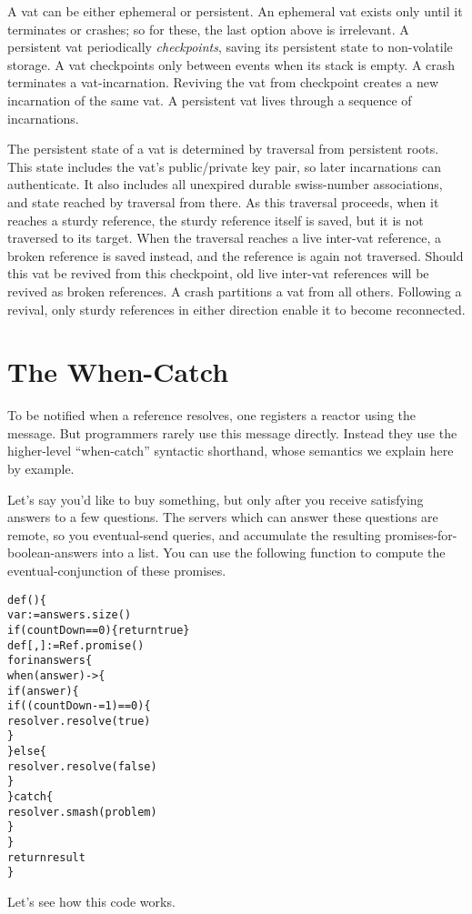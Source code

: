 \documentclass{llncs}
\begin{document}
A vat can be either ephemeral or persistent. An ephemeral vat exists
only until it terminates or crashes; so for these, the last option
above is irrelevant. A persistent vat periodically \emph{checkpoints},
saving its persistent state to non-volatile storage. A vat checkpoints
only between events when its stack is empty. A crash terminates a
vat-incarnation. Reviving the vat from checkpoint creates a new
incarnation of the same vat. A persistent vat lives through a sequence
of incarnations.

The persistent state of a vat is determined by traversal from
persistent roots. This state includes the vat's public/private key
pair, so later incarnations can authenticate. It also includes all
unexpired durable swiss-number associations, and state reached by
traversal from there. As this traversal proceeds, when it reaches a
sturdy reference, the sturdy reference itself is saved, but it is not
traversed to its target. When the traversal reaches a live inter-vat
reference, a broken reference is saved instead, and the reference is
again not traversed. Should this vat be revived from this checkpoint,
old live inter-vat references will be revived as broken references. A
crash partitions a vat from all others. Following a revival, only
sturdy references in either direction enable it to become reconnected.

\section{The When-Catch}

To be notified when a reference resolves, one registers a reactor
using the  message. But programmers rarely
use this message directly. Instead they use the higher-level
``when-catch'' syntactic shorthand, whose semantics we explain here by
example.

Let's say you'd like to buy something, but only after you receive
satisfying answers to a few questions. The servers which can answer
these questions are remote, so you eventual-send queries, and
accumulate the resulting promises-for-boolean-answers into a list. You
can use the following  function to compute the
eventual-conjunction of these promises.
%
\begin{alltt}
    def () \{
        var  := answers.size()
        if (countDown == 0) \{ return true \}
        def [, ] := Ref.promise()
        for  in answers \{
            when (answer) -> \{
                if (answer) \{
                    if ((countDown -= 1) == 0) \{
                        resolver.resolve(true) 
                    \}
                \} else \{
                    resolver.resolve(false)
                \}
            \} catch  \{
                resolver.smash(problem)
            \}
        \}
        return result
    \}
\end{alltt}
%
Let's see how this code works.
\end{document}
